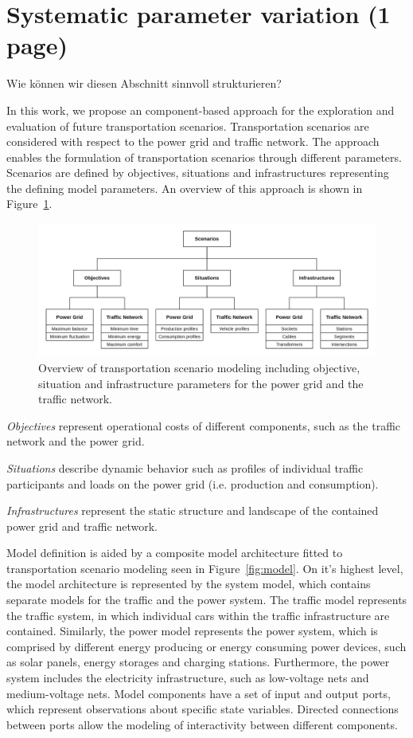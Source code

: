 \section{Systematic parameter variation (1 page)}
\label{section:contribution_2}

{\color{red} Wie k\"onnen wir diesen Abschnitt sinnvoll strukturieren?}

In this work, we propose an component-based approach for the exploration and evaluation of future transportation scenarios. Transportation scenarios are considered with respect to the power grid and traffic network. The approach enables the formulation of transportation scenarios through different parameters. Scenarios are defined by objectives, situations and infrastructures representing the defining model parameters. An overview of this approach is shown in Figure~\ref{fig:approach}. 

\begin{figure}[h]
	\centering
	\includegraphics[width=\columnwidth]{../gfx/approach.png}
	\caption{Overview of transportation scenario modeling including objective, situation and infrastructure parameters for the power grid and the traffic network.}
	\label{fig:approach}
\end{figure}

\textit{Objectives} represent operational costs of different components, such as the traffic network and the power grid. 

\textit{Situations}  describe dynamic behavior such as profiles of individual traffic participants and loads on the power grid (i.e. production and consumption).

\textit{Infrastructures} represent the static structure and landscape of the contained power grid and traffic network. 

Model definition is aided by a composite model architecture fitted to transportation scenario modeling seen in Figure~\ref{fig:model}. On it's highest level, the model architecture is represented by the system model, which contains separate models for the traffic and the power system. The traffic model represents the traffic system, in which individual cars within the traffic infrastructure are contained. Similarly, the power model represents the power system, which is comprised by different energy producing or energy consuming power devices, such as solar panels, energy storages and charging stations. Furthermore, the power system includes the electricity infrastructure, such as low-voltage nets and medium-voltage nets. Model components have a set of input and output ports, which represent observations about specific state variables. Directed connections between ports allow the modeling of interactivity between different components.

